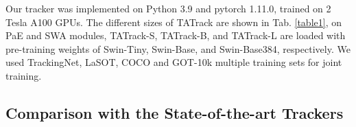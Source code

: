 \documentclass[letterpaper]{article} \usepackage{aaai23}  \usepackage{times}  \usepackage{helvet}  \usepackage{courier}  \usepackage[hyphens]{url}  \usepackage{graphicx} \urlstyle{rm} \def\UrlFont{\rm}  \usepackage{natbib}  \usepackage{caption} \frenchspacing  \setlength{\pdfpagewidth}{8.5in}  \setlength{\pdfpageheight}{11in}  \usepackage{algorithm}
\begin{document}
\begin{table}[t]
\small      \centering
{}
\caption{The network structure parameters of TATrack-S, TATrack-B, and TATrack-L. The number of , , ,  corresponds to Fig. \ref{fig2}}
\label{table1}
\end{table}
Our tracker was implemented on Python 3.9 and pytorch 1.11.0, trained on 2 Tesla A100 GPUs. The different sizes of TATrack are shown in Tab. \ref{table1}, on PaE and SWA modules, TATrack-S, TATrack-B, and TATrack-L are loaded with pre-training weights of Swin-Tiny, Swin-Base, and Swin-Base384, respectively. We used TrackingNet, LaSOT, COCO and GOT-10k multiple training sets for joint training.

\subsection{Comparison with the State-of-the-art Trackers}
\end{document}
